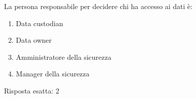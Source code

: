 
\begin{Exercise} [
  title={Gestione dei dati},
  label={bcdr6}
 ]
 
 \Question La persona responsabile per decidere chi ha accesso ai dati è:
 \begin{enumerate}
   \item Data custodian
   \item Data owner
   \item Amministratore della sicurezza
   \item Manager della sicurezza
 \end{enumerate}
\end{Exercise}


\begin{Answer} [
  ref={bcdr6},
  number={6}
  ]
  
  \Question Risposta esatta: 2
  
\end{Answer}
